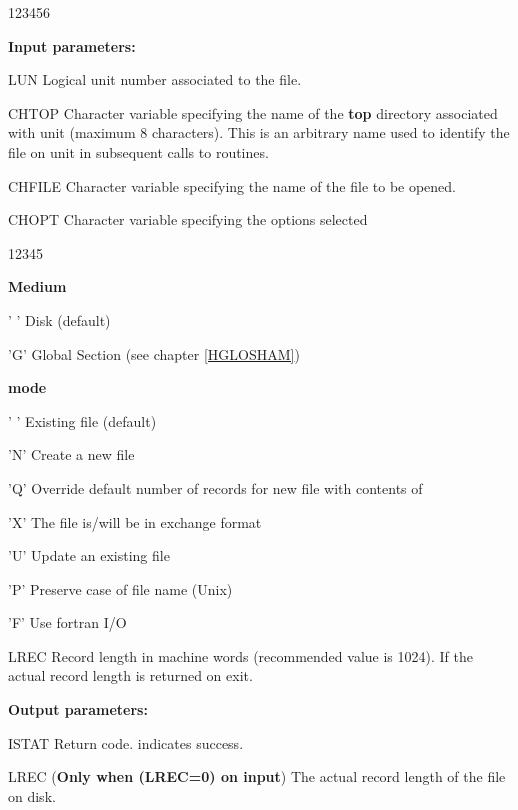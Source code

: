 \begin{DLtt}{123456}
\item[{\rm\bf Input parameters:}]
\item[LUN]
    Logical unit number associated to the file.
\item[CHTOP]
    Character variable specifying the name of the {\bf top} directory
    associated with unit  (maximum 8 characters).
    This is an arbitrary name used to identify the file on unit 
    in subsequent calls to  routines.
\item[CHFILE]
    Character variable specifying the name of the file to be opened.
\item[CHOPT]
    Character variable specifying the options selected
    \begin{DLtt}{12345}
        \item[{\rm\bf Medium}]
        \begin{DLtt}{12}
            \item[' '] Disk (default)
            \item['G'] Global Section (see chapter \ref{HGLOSHAM})
        \end{DLtt}
        \item[{\rm\bf mode}]
        \begin{DLtt}{12}
            \item[' '] Existing  file (default)
            \item['N'] Create a new file
            \item['Q'] Override default number of records for new file
                with contents of 
            \item['X'] The file is/will be in exchange format
            \item['U'] Update an existing file
            \item['P'] Preserve case of file name (Unix)
            \item['F'] Use fortran I/O
        \end{DLtt}
    \end{DLtt}
    \item[LREC] Record length in machine words (recommended value is 1024).
                If  the actual record length is returned on exit.
\newpage\item[{\rm\bf Output parameters:}]
    \item[ISTAT] Return code.  indicates success.
    \item[LREC] (\textbf{Only when \Lit(LREC=0) on input})
                The actual record length of the file on disk.
\end{DLtt}
     
